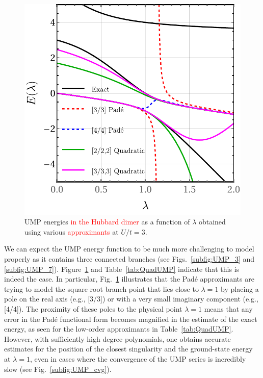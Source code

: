 \documentclass[aps,prb,reprint,noshowkeys,superscriptaddress]{revtex4-1}
\newcommand{\titou}[1]{\textcolor{red}{#1}}
\newcommand{\latin}[1]{#1}
\newcommand{\eg}{\latin{e.g.}}
\begin{document}
\begin{figure}[t]
    \includegraphics[width=\linewidth]{fig10}
    \caption{\label{fig:QuadUMP}
    UMP energies \titou{in the Hubbard dimer} as a function of $\lambda$ obtained using various \titou{approximants} at $U/t = 3$.}
\end{figure}

We can expect the UMP energy function to be much more challenging 
to model properly as it contains three connected branches 
(see Figs.~\ref{subfig:UMP_3} and \ref{subfig:UMP_7}).
Figure~\ref{fig:QuadUMP} and Table~\ref{tab:QuadUMP} indicate that this is indeed the case. 
In particular, Fig.~\ref{fig:QuadUMP} illustrates that the Pad\'e approximants are trying to model
the square root branch point that lies close to $\lambda = 1$ by placing a pole on the real axis
(\eg, [3/3]) or with a very small imaginary component (\eg, [4/4]).
The proximity of these poles to the physical point $\lambda = 1$ means that any error in the Pad\'e 
functional form becomes magnified in the estimate of the exact energy, as seen for the low-order
approximants in Table~\ref{tab:QuadUMP}.
However, with sufficiently high degree polynomials, one obtains
accurate estimates for the position of the closest singularity and the ground-state energy at $\lambda = 1$,
even in cases where the convergence of the UMP series is incredibly slow 
(see Fig.~\ref{subfig:UMP_cvg}).
\end{document}
